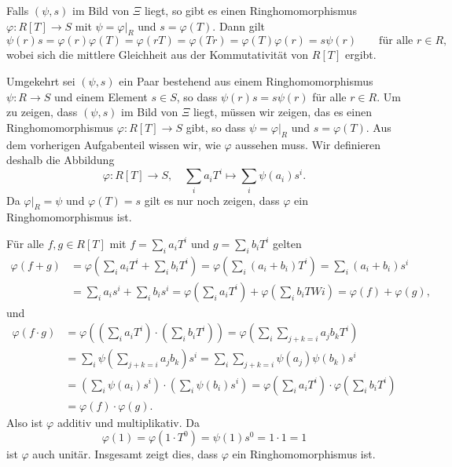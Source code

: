 \documentclass[a4paper, 10pt, numbers=noenddot]{scrartcl}
\begin{document}
Falls $(\psi, s)$ im Bild von $\Xi$ liegt, so gibt es einen Ringhomomorphismus $\varphi \colon R[T] \to S$ mit $\psi = \varphi|_R$ und $s = \varphi(T)$.
Dann gilt
\[
    \psi(r) s
  = \varphi(r) \varphi(T)
  = \varphi(r T)
  = \varphi(T r)
  = \varphi(T) \varphi(r)
  = s \psi(r)
  \qquad
  \text{für alle $r \in R$},
\]
wobei sich die mittlere Gleichheit aus der Kommutativität von $R[T]$ ergibt.

Umgekehrt sei $(\psi, s)$ ein Paar bestehend aus einem Ringhomomorphismus $\psi \colon R \to S$ und einem Element $s \in S$, so dass $\psi(r) s = s \psi(r)$ für alle $r \in R$.
Um zu zeigen, dass $(\psi, s)$ im Bild von $\Xi$ liegt, müssen wir zeigen, das es einen Ringhomomorphismus $\varphi \colon R[T] \to S$ gibt, so dass $\psi = \varphi|_R$ und $s = \varphi(T)$.
Aus dem vorherigen Aufgabenteil wissen wir, wie $\varphi$ aussehen muss.
Wir definieren deshalb die Abbildung
\[
  \varphi \colon R[T] \to S,
  \quad
  \sum_i a_i T^i \mapsto \sum_i \psi(a_i) s^i.
\]
Da $\varphi|_R = \psi$ und $\varphi(T) = s$ gilt es nur noch zeigen, dass $\varphi$ ein Ringhomomorphismus ist.

Für alle $f, g \in R[T]$ mit $f = \sum_i a_i T^i$ und $g = \sum_i b_i T^i$ gelten
\begin{align*}
      \varphi(f + g)
  &=  \varphi\left( \sum_i a_i T^i + \sum_i b_i T^i \right)
   =  \varphi\left( \sum_i (a_i + b_i) T^i \right)
   =  \sum_i (a_i + b_i) s^i
  \\
  &=  \sum_i a_i s^i + \sum_i b_i s^i
   =  \varphi\left( \sum_i a_i T^i \right) + \varphi\left( \sum_i b_i TWi \right)
   =  \varphi(f) + \varphi(g),
\end{align*}
und
\begin{align*}
    \varphi(f \cdot g)
  &= \varphi\left( \left( \sum_i a_i T^i \right) \cdot \left( \sum_i b_i T^i \right) \right)
   = \varphi\left( \sum_i \sum_{j + k = i} a_j b_k T^i \right)
  \\
  &= \sum_i \psi\left( \sum_{j + k = i} a_j b_k \right) s^i
   = \sum_i \sum_{j + k = i} \psi(a_j) \psi(b_k) s^i
  \\
  &= \left( \sum_i \psi(a_i) s^i \right) \cdot \left( \sum_i \psi(b_i) s^i \right)
   = \varphi\left( \sum_i a_i T^i \right) \cdot \varphi\left( \sum_i b_i T^i \right)
  \\
  &= \varphi(f) \cdot \varphi(g).
\end{align*}
Also ist $\varphi$ additiv und multiplikativ.
Da
\[
    \varphi(1)
  = \varphi(1 \cdot T^0)
  = \psi(1) s^0
  = 1 \cdot 1
  = 1
\]
ist $\varphi$ auch unitär.
Insgesamt zeigt dies, dass $\varphi$ ein Ringhomomorphismus ist.
\end{document}
